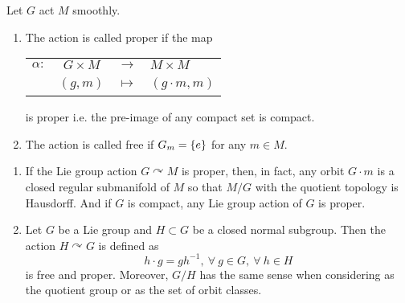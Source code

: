 \documentclass[a4paper,12pt]{article}
\begin{document}
	\begin{defn}
		Let $G$ act $M$ smoothly.
		\begin{enumerate}
			\item The action is called proper if the map
			\begin{center}
				\begin{tabular}{l c c l}
					$\alpha \colon$ & $G \times M$ & $\longrightarrow$ & $M \times M$ \\
					~ & $(g,m)$ & $\longmapsto$ & $(g \cdot m,m)$
				\end{tabular}
			\end{center}
			is proper i.e. the pre-image of any compact set is compact.
			\item The action is called free if $G_m = \left\{e\right\}$ for any $m \in M$.
		\end{enumerate}
	\end{defn}
	\begin{rem}
		\begin{enumerate}
			\item If the Lie group action $G \curvearrowright M$ is proper, then, in fact, any orbit $G \cdot m$ is a closed regular submanifold of $M$ so that $M/G$ with the quotient topology is Hausdorff. And if $G$ is compact, any Lie group action of $G$ is proper.
			\item Let $G$ be a Lie group and $H \subset G$ be a closed normal subgroup. Then the action $H \curvearrowright G$ is defined as 
			\begin{equation*}
				h \cdot g = gh^{-1},~\forall~g \in G,~\forall~h \in H 
			\end{equation*}
			is free and proper. Moreover, $G / H$ has the same sense when considering as the quotient group or as the set of orbit classes.
		\end{enumerate}
	\end{rem}
\end{document}
